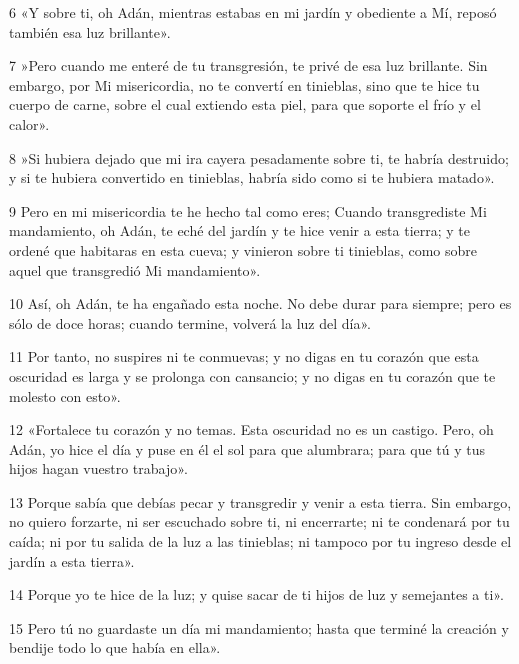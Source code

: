 \par 6 «Y sobre ti, oh Adán, mientras estabas en mi jardín y obediente a Mí, reposó también esa luz brillante».

\par 7 »Pero cuando me enteré de tu transgresión, te privé de esa luz brillante. Sin embargo, por Mi misericordia, no te convertí en tinieblas, sino que te hice tu cuerpo de carne, sobre el cual extiendo esta piel, para que soporte el frío y el calor».

\par 8 »Si hubiera dejado que mi ira cayera pesadamente sobre ti, te habría destruido; y si te hubiera convertido en tinieblas, habría sido como si te hubiera matado».

\par 9 Pero en mi misericordia te he hecho tal como eres; Cuando transgrediste Mi mandamiento, oh Adán, te eché del jardín y te hice venir a esta tierra; y te ordené que habitaras en esta cueva; y vinieron sobre ti tinieblas, como sobre aquel que transgredió Mi mandamiento».

\par 10 Así, oh Adán, te ha engañado esta noche. No debe durar para siempre; pero es sólo de doce horas; cuando termine, volverá la luz del día».

\par 11 Por tanto, no suspires ni te conmuevas; y no digas en tu corazón que esta oscuridad es larga y se prolonga con cansancio; y no digas en tu corazón que te molesto con esto».

\par 12 «Fortalece tu corazón y no temas. Esta oscuridad no es un castigo. Pero, oh Adán, yo hice el día y puse en él el sol para que alumbrara; para que tú y tus hijos hagan vuestro trabajo».

\par 13 Porque sabía que debías pecar y transgredir y venir a esta tierra. Sin embargo, no quiero forzarte, ni ser escuchado sobre ti, ni encerrarte; ni te condenará por tu caída; ni por tu salida de la luz a las tinieblas; ni tampoco por tu ingreso desde el jardín a esta tierra».

\par 14 Porque yo te hice de la luz; y quise sacar de ti hijos de luz y semejantes a ti».

\par 15 Pero tú no guardaste un día mi mandamiento; hasta que terminé la creación y bendije todo lo que había en ella».

